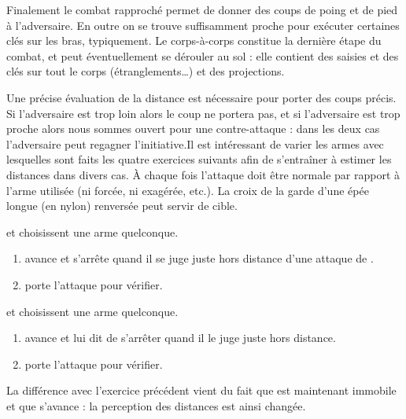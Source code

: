 Finalement le combat rapproché permet de donner des coups de poing et de pied à l'adversaire.
En outre on se trouve suffisamment proche pour exécuter certaines clés sur les bras, typiquement.
Le corps-à-corps constitue la dernière étape du combat, et peut éventuellement se dérouler au sol : elle contient des saisies et des clés sur tout le corps (étranglements…) et des projections.

Une précise évaluation de la distance est nécessaire pour porter des coups précis.
Si l'adversaire est trop loin alors le coup ne portera pas, et si l'adversaire est trop proche alors nous sommes ouvert pour une contre-attaque : dans les deux cas l'adversaire peut regagner l'initiative.Il est intéressant de varier les armes avec lesquelles sont faits les quatre exercices suivants afin de s'entraîner à estimer les distances dans divers cas.
À chaque fois l'attaque doit être normale par rapport à l'arme utilisée (ni forcée, ni exagérée, etc.).
La croix de la garde d'une épée longue (en nylon) renversée peut servir de cible.


\begin{exercice}
	
	
	\A et \D choisissent une arme quelconque.

	\begin{enumerate}
		\item \D avance et s'arrête quand il se juge juste hors distance d'une attaque de \A.
		
		\item \A porte l'attaque pour vérifier.
	\end{enumerate}
	
\end{exercice}


\begin{exercice}
	
	
	\A et \D choisissent une arme quelconque.

	\begin{enumerate}
		\item \A avance et \D lui dit de s'arrêter quand il le juge juste hors distance.
		
		\item \A porte l'attaque pour vérifier.
	\end{enumerate}
	
	La différence avec l'exercice précédent vient du fait que \D est maintenant immobile et que \A s'avance : la perception des distances est ainsi changée.

\end{exercice}


